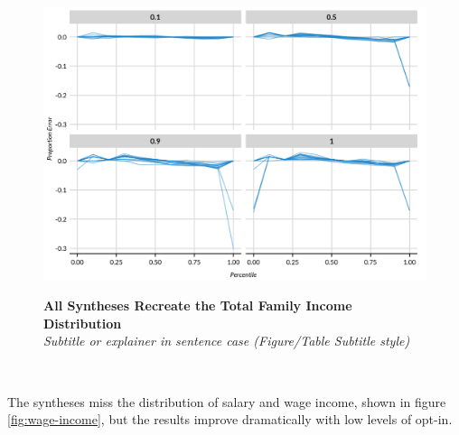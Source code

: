 \documentclass[
]{urban-formatting}
\begin{document}
\begin{figure}[htbp]
    \caption{
    \textbf{All Syntheses Recreate the Total Family Income Distribution}\\
    \textit{Subtitle or explainer in sentence case (Figure/Table Subtitle style)}
    }
    \centering
    \includegraphics[width=6.5in]{../analysis/figures/percentiles-2.png}
    \label{fig:family-income}
\end{figure}
\begin{singlespace}
    \\
\end{singlespace}

The syntheses miss the distribution of salary and wage income, shown in
figure \ref{fig:wage-income}, but the results improve dramatically with
low levels of opt-in.
\end{document}
